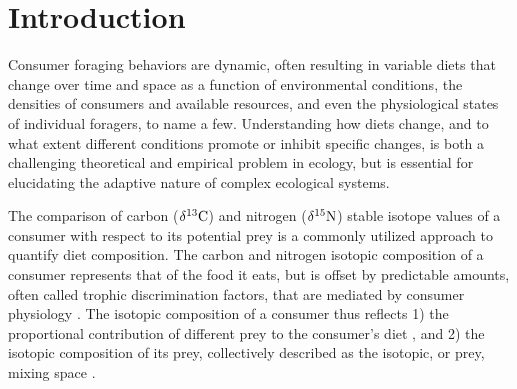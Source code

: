 \documentclass{article}
\begin{document}

%


\section{Introduction}

Consumer foraging behaviors are dynamic, often resulting in variable diets that change over time and space as a function of environmental conditions, the densities of consumers and available resources, and even the physiological states of individual foragers, to name a few.
Understanding how diets change, and to what extent different conditions promote or inhibit specific changes, is both a challenging theoretical and empirical problem in ecology, but is essential for elucidating the adaptive nature of complex ecological systems.

The comparison of carbon ($\delta^{13}\rm{C}$) and nitrogen ($\delta^{15}\rm{N}$) stable isotope values of a consumer with respect to its potential prey is a commonly utilized approach to quantify diet composition.
The carbon and nitrogen isotopic composition of a consumer represents that of the food it eats, but is offset by predictable amounts, often called trophic discrimination factors, that are mediated by consumer physiology \citep{VanderZanden:2001p2449,Post:2002wn,FoxDobbs:2007kx,Bearhop:2010db}.
The isotopic composition of a consumer thus reflects
1) the proportional contribution of different prey to the consumer's diet \citep{Moore:2008kg,Parnell:2010ub}, and
2) the isotopic composition of its prey, collectively described as the isotopic, or prey, mixing space \citep{Phillips:2001ws,Phillips:2002tu,Newsome:2007tz}.
\end{document}
